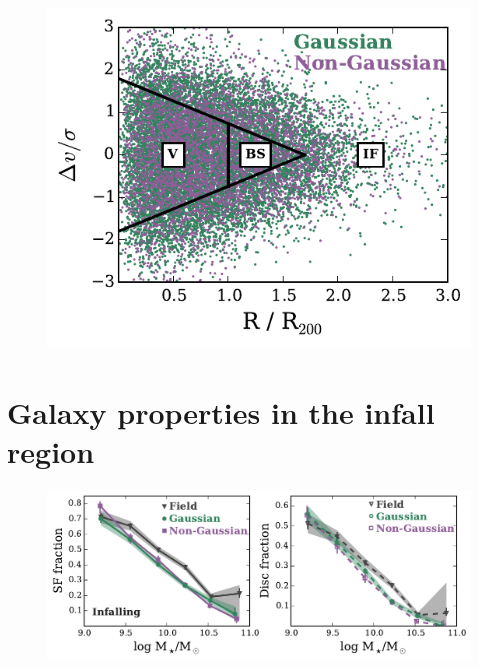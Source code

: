 \documentclass[a4paper,fleqn,usenatbib]{mnras}
\begin{document}
\begin{figure}
  \centering
  \includegraphics[width=\columnwidth]{vnorm_r.pdf}
  \caption{}
  \label{fig:vnorm_r}
\end{figure}


\section{Galaxy properties in the infall region}
\label{sec:infall}

\begin{figure}
  \centering
  \includegraphics[width=\textwidth]{disk_sfFrac_w2_if.pdf}
  \caption{}
  \label{fig:disk_sfFrac_if}
\end{figure}
\end{document}
